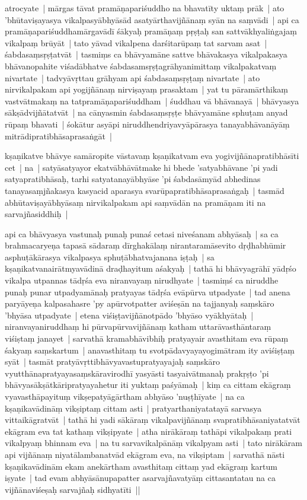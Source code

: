 \documentclass[article,a4paper]{memoir}
\begin{document}
	  \pstart atrocyate | mā\-rgas tā\-vat pramā\-ṇapariśuddho na bhavatī\-ty uktaṃ prā\-k | ato 'bhū\-taviṣayasya vikalpasyā\-bhyā\-sā\-d asatyā\-rthavijñā\-naṃ syā\-n na saṃvā\-di | api ca pramā\-ṇapariśuddhamā\-rgavā\-dī\- śā\-kyaḥ pramā\-ṇaṃ pṛṣṭaḥ san sattvā\-khyaliṅgajaṃ vikalpaṃ brū\-yā\-t | tato yā\-vad vikalpena darśitarū\-paṃ tat sarvam asat | śabdasaṃsṛṣṭatvā\-t | tasmiṃs ca bhā\-vyamā\-ne sattve bhā\-vakasya vikalpakasya bhā\-vanopahite viśadā\-bhatve śabdasamsṛṣṭagrā\-hyanimittaṃ vikalpakatvaṃ nivartate | tadvyā\-vṛttau grā\-hyam api śabdasaṃsṛṣṭaṃ nivartate | ato nirvikalpakam api yogijñā\-naṃ nirviṣayaṃ prasaktam | yat tu pā\-ramā\-rthikaṃ vastvā\-tmakaṃ na tatpramā\-ṇapariśuddham | śuddhau vā\- bhā\-vanayā\- | bhā\-vyasya sā\-kṣā\-dvijñā\-tatvā\-t | na cā\-nyasmin śabdasaṃsṛṣṭe bhā\-vyamā\-ne sphuṭam anyad rū\-paṃ bhavati | śokā\-tur asyā\-pi niruddhendriyavyā\-pā\-rasya tanayabhā\-vanā\-yā\-ṃ mitrā\-dipratibhā\-saprasaṅgā\-t | 
	\pend
      

	  \pstart kṣaṇikatve bhā\-vye samā\-ropite vā\-stavaṃ kṣaṇikatvam eva yogivijñā\-napratibhā\-sī\-ti cet | na | satyā\-satyayor ekatvā\-bhā\-vā\-tmake hi bhede 'satyabhā\-vane 'pi yadi satyapratibhā\-saḥ, tarhi satyatanayā\-bhyā\-se 'pi śabdasā\-myā\-d abhedinas tanayasaṃjñakasya kasyacid aparasya svarū\-papratibhā\-saprasaṅgaḥ | tasmā\-d abhū\-taviṣayā\-bhyā\-saṃ nirvikalpakam api saṃvā\-dā\-n na pramā\-ṇam iti na sarvajñasiddhiḥ | 
	\pend
      

	  \pstart api ca bhā\-vyasya vastunaḥ punaḥ punaś cetasi niveśanam abhyā\-saḥ | sa ca brahmacaryeṇa tapasā\- sā\-daraṃ dī\-rghakā\-laṃ nirantaramā\-sevito dṛḍhabhū\-mir asphuṭā\-kā\-rasya vikalpasya sphuṭā\-bhatvajanana iṣṭaḥ | sa kṣaṇikatvanairā\-tmyavā\-dinā\- draḍhayitum aśakyaḥ | tathā\- hi bhā\-vyagrā\-hī\- yā\-dṛśo vikalpa utpannas tā\-dṛśa eva niranvayaṃ nirudhyate | tasmiṃś ca niruddhe punaḥ punar utpadyamā\-naḥ pratyayas tā\-dṛśa evā\-pū\-rva utpadyate | tad anena paryā\-yeṇa kalpasahasre 'py apū\-rvotpatter aviśeṣā\-n na tajjanyaḥ saṃskā\-ro 'bhyā\-sa utpadyate | etena viśiṣṭavijñā\-notpā\-do 'bhyā\-so vyā\-khyā\-taḥ | niranvayaniruddhaṃ hi pū\-rvapū\-rvavijñā\-naṃ katham uttarā\-vasthā\-ntaraṃ viśiṣtaṃ janayet | sarvathā\- kramabhā\-vibhiḥ pratyayair avasthitam eva rū\-paṃ śakyaṃ saṃskartum | anavasthitaṃ tu svotpā\-davyayayogimā\-tram ity aviśiṣṭaṃ syā\-t | tasmā\-t pratyā\-vṛttibhā\-vyavastupratyayajaḥ saṃskā\-ro vyutthā\-napratyayasaṃskā\-ravirodhī\- yasyā\-sti tasyaivā\-tmanaḥ prakṛṣṭo 'pi bhā\-vyasā\-kṣā\-tkā\-ripratyayahetur iti yuktaṃ paśyā\-maḥ | kiṃ ca cittam ekā\-graṃ vyavasthā\-payituṃ vikṣepatyā\-gā\-rtham abhyā\-so 'nuṣṭhī\-yate | na ca kṣaṇikavā\-dinā\-ṃ vikṣiptaṃ cittam asti | pratyarthaniyatatayā\- sarvasya vittaikā\-gratvā\-t | tathā\- hi yadi sā\-kā\-raṃ vikalpavijñā\-naṃ svapratibhā\-saniyatatvā\-t ekā\-gram eva tat kathaṃ vikṣipyate | atha nirā\-kā\-raṃ tathā\-pi vikalpakaṃ prati vikalpyaṃ bhinnam eva | na tu sarvavikalpā\-nā\-ṃ vikalpyam asti | tato nirā\-kā\-ram api vijñā\-naṃ niyatā\-lambanatvā\-d ekā\-gram eva, na vikṣiptam | sarvathā\- nā\-sti kṣaṇikavā\-dinā\-m ekam anekā\-rtham avasthitaṃ cittaṃ yad ekā\-graṃ kartum iṣyate | tad evam abhyā\-sā\-nupapatter asarvajñavatyā\-ṃ cittasantatau na ca vijñā\-naviśeṣaḥ sarvajñaḥ sidhyatī\-ti || 
	\pend
      
\end{document}
